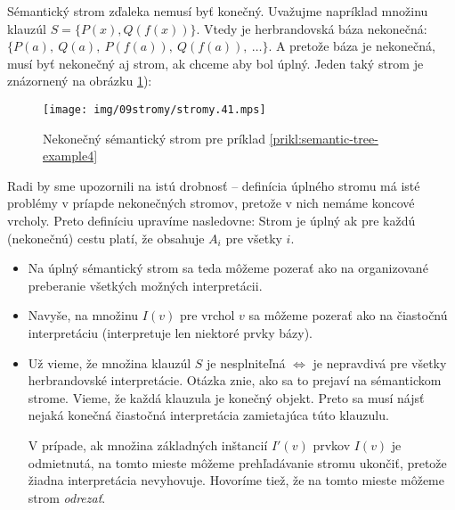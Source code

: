 \begin{priklad}
    \label{prikl:semantic-tree-example4}
    Sémantický strom zďaleka nemusí byť konečný. Uvažujme napríklad množinu
    klauzúl $S=\{P(x), Q(f(x)) \}$.
    Vtedy je herbrandovská báza nekonečná: 
    $\{ P(a),\ Q(a),\ P(f(a)),\ Q(f(a)),\ \ldots \}$.
    A pretože báza je nekonečná, musí byť nekonečný aj strom, ak chceme aby
    bol úplný. Jeden taký strom je znázornený na obrázku
    \ref{fig:semantic-tree-example4}):

    \begin{figure}[h]
        \centering
        \texttt{[image: img/09stromy/stromy.41.mps]}
        \caption{Nekonečný sémantický strom pre príklad
                \ref{prikl:semantic-tree-example4}}
        \label{fig:semantic-tree-example4}
    \end{figure}
\end{priklad}

\begin{poznamka}
    Radi by sme upozornili na istú drobnosť -- definícia úplného stromu má
    isté problémy v príapde nekonečných stromov, pretože v nich nemáme
    koncové vrcholy. Preto definíciu upravíme nasledovne:
    Strom je úplný ak pre každú (nekonečnú) cestu platí, že obsahuje $A_i$
    pre všetky $i$.
\end{poznamka}

\begin{poznamka}
    \noindent
    \begin{itemize}
    \item Na úplný sémantický strom sa teda môžeme pozerať ako na organizované
        preberanie všetkých možných interpretácii.
    \item Navyše, na množinu $I(v)$ pre vrchol $v$ sa môžeme pozerať ako na
        čiastočnú interpretáciu (interpretuje len niektoré prvky bázy).
    \item Už vieme, že množina klauzúl $S$ je nesplniteľná $\iff$
        je nepravdivá pre všetky herbrandovské interpretácie. Otázka znie,
        ako sa to prejaví na sémantickom strome. Vieme, že každá klauzula
        je konečný objekt. Preto sa musí nájsť nejaká konečná čiastočná
        interpretácia zamietajúca túto klauzulu.

        V prípade, ak množina základných inštancií $I'(v)$ prvkov $I(v)$
        je odmietnutá, na tomto mieste môžeme prehľadávanie stromu ukončiť,
        pretože žiadna interpretácia nevyhovuje. Hovoríme tiež,
        že na tomto mieste môžeme strom \emph{odrezať}.
    \end{itemize}
\end{poznamka}

